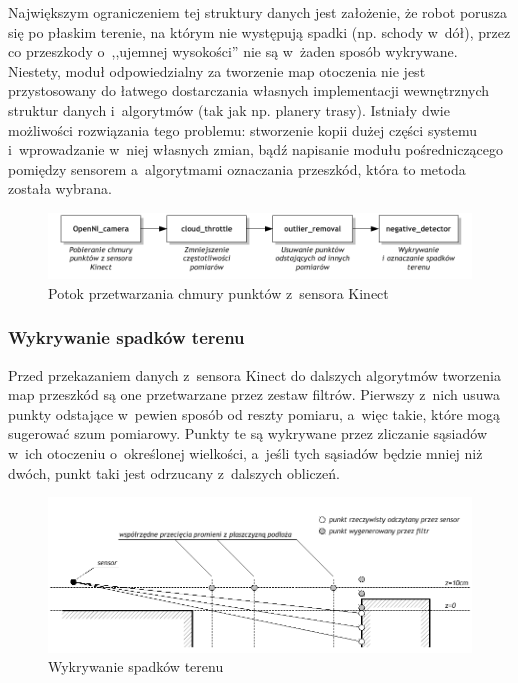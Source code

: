Największym ograniczeniem tej struktury danych jest założenie, że robot porusza
się po płaskim terenie, na którym nie występują spadki (np. schody w~dół), przez
co przeszkody o~,,ujemnej wysokości'' nie są w~żaden sposób wykrywane. Niestety,
moduł odpowiedzialny za tworzenie map otoczenia nie jest przystosowany do
łatwego dostarczania własnych implementacji wewnętrznych struktur danych
i~algorytmów (tak jak np. planery trasy). Istniały dwie możliwości
rozwiązania tego problemu: stworzenie kopii dużej części systemu i~wprowadzanie
w~niej własnych zmian, bądź napisanie modułu pośredniczącego pomiędzy sensorem
a~algorytmami oznaczania przeszkód, która to metoda została wybrana.

\begin{figure}[htb!]
\centering
\includegraphics{../img/filtering}
\caption{Potok przetwarzania chmury punktów z~sensora Kinect}
\label{fig:filtering}
\end{figure}

\subsubsection{Wykrywanie spadków terenu}

Przed przekazaniem danych z~sensora Kinect do dalszych algorytmów tworzenia map
przeszkód są one przetwarzane przez zestaw filtrów. Pierwszy z~nich usuwa punkty
odstające w~pewien sposób od reszty pomiaru, a~więc takie, które mogą sugerować
szum pomiarowy. Punkty te są wykrywane przez zliczanie sąsiadów w~ich otoczeniu
o~określonej wielkości, a~jeśli tych sąsiadów będzie mniej niż dwóch, punkt taki
jest odrzucany z~dalszych obliczeń.

\begin{figure}[htb!]
\centering
\includegraphics{../../Common/img/depresion}
\caption{Wykrywanie spadków terenu}
\label{fig:depresion}
\end{figure}

